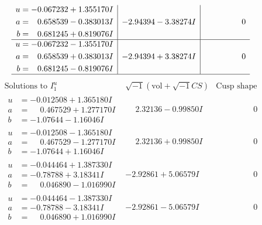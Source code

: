 \documentclass[1p]{elsarticle_modified}
\theoremstyle{definition}
\newcommand{\I}{\sqrt{-1}}
\begin{document}
$$\begin{array}{c|c|c}
\begin{aligned}
u &= -0.067232 + 1.355170 I \\
a &= \phantom{-}0.658539 - 0.383013 I \\
b &= \phantom{-}0.681245 + 0.819076 I\end{aligned}
 & -2.94394 - 3.38274 I & \phantom{-0.000000 } 0 \\ \hline\begin{aligned}
u &= -0.067232 - 1.355170 I \\
a &= \phantom{-}0.658539 + 0.383013 I \\
b &= \phantom{-}0.681245 - 0.819076 I\end{aligned}
 & -2.94394 + 3.38274 I & \phantom{-0.000000 } 0\\
 \hline 
 \end{array}$$\newpage$$\begin{array}{c|c|c}  
\text{Solutions to }I^u_{1}& \I (\text{vol} + \sqrt{-1}CS) & \text{Cusp shape}\\
 \hline 
\begin{aligned}
u &= -0.012508 + 1.365180 I \\
a &= \phantom{-}0.467529 + 1.277170 I \\
b &= -1.07644 - 1.16046 I\end{aligned}
 & \phantom{-}2.32136 - 0.99850 I & \phantom{-0.000000 } 0 \\ \hline\begin{aligned}
u &= -0.012508 - 1.365180 I \\
a &= \phantom{-}0.467529 - 1.277170 I \\
b &= -1.07644 + 1.16046 I\end{aligned}
 & \phantom{-}2.32136 + 0.99850 I & \phantom{-0.000000 } 0 \\ \hline\begin{aligned}
u &= -0.044464 + 1.387330 I \\
a &= -0.78788 + 3.18341 I \\
b &= \phantom{-}0.046890 - 1.016990 I\end{aligned}
 & -2.92861 + 5.06579 I & \phantom{-0.000000 } 0 \\ \hline\begin{aligned}
u &= -0.044464 - 1.387330 I \\
a &= -0.78788 - 3.18341 I \\
b &= \phantom{-}0.046890 + 1.016990 I\end{aligned}
 & -2.92861 - 5.06579 I & \phantom{-0.000000 } 0 \\ \hline\begin{aligned}

\end{aligned}
\end{array}$$
\end{document}
